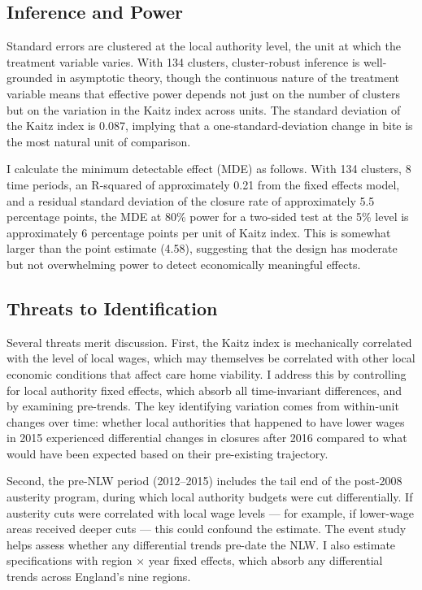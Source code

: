 \documentclass[12pt]{article}
\begin{document}
\subsection{Inference and Power}

Standard errors are clustered at the local authority level, the unit at which the treatment variable varies. With 134 clusters, cluster-robust inference is well-grounded in asymptotic theory, though the continuous nature of the treatment variable means that effective power depends not just on the number of clusters but on the variation in the Kaitz index across units. The standard deviation of the Kaitz index is 0.087, implying that a one-standard-deviation change in bite is the most natural unit of comparison.

I calculate the minimum detectable effect (MDE) as follows. With 134 clusters, 8 time periods, an R-squared of approximately 0.21 from the fixed effects model, and a residual standard deviation of the closure rate of approximately 5.5 percentage points, the MDE at 80\% power for a two-sided test at the 5\% level is approximately 6 percentage points per unit of Kaitz index. This is somewhat larger than the point estimate (4.58), suggesting that the design has moderate but not overwhelming power to detect economically meaningful effects.

\subsection{Threats to Identification}

Several threats merit discussion. First, the Kaitz index is mechanically correlated with the level of local wages, which may themselves be correlated with other local economic conditions that affect care home viability. I address this by controlling for local authority fixed effects, which absorb all time-invariant differences, and by examining pre-trends. The key identifying variation comes from within-unit changes over time: whether local authorities that happened to have lower wages in 2015 experienced differential changes in closures after 2016 compared to what would have been expected based on their pre-existing trajectory.

Second, the pre-NLW period (2012--2015) includes the tail end of the post-2008 austerity program, during which local authority budgets were cut differentially. If austerity cuts were correlated with local wage levels --- for example, if lower-wage areas received deeper cuts --- this could confound the estimate. The event study helps assess whether any differential trends pre-date the NLW. I also estimate specifications with region $\times$ year fixed effects, which absorb any differential trends across England's nine regions.
\end{document}
